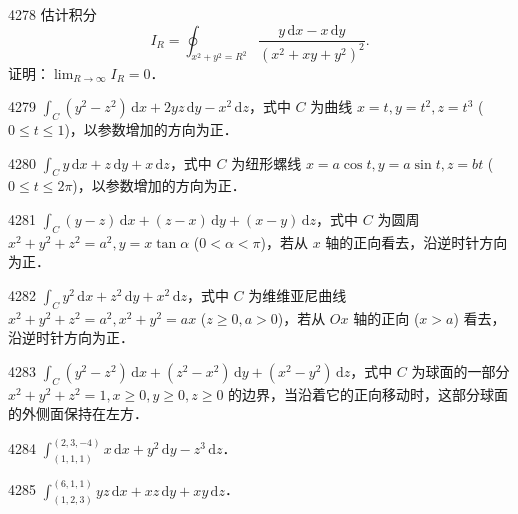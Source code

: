 \begin{prob}[M]{4278}
估计积分
\[
I_R = \oint_{x^2+y^2=R^2} \frac{y\,\mathrm{d}x - x\,\mathrm{d}y}{(x^2+xy+y^2)^2}.
\]
证明：$\lim_{R\to\infty} I_R = 0$．
\end{prob}


\begin{prob}[S]{4279}
$\displaystyle\int_C (y^2 - z^2)\,\mathrm{d}x + 2yz\,\mathrm{d}y - x^2\,\mathrm{d}z$，式中 $C$ 为曲线 $x = t, y = t^2, z = t^3$ ($0 \leqslant t \leqslant 1$)，以参数增加的方向为正．
\end{prob}

\begin{prob}[S]{4280}
$\displaystyle\int_C y\,\mathrm{d}x + z\,\mathrm{d}y + x\,\mathrm{d}z$，式中 $C$ 为纽形螺线 $x = a\cos t, y = a\sin t, z = bt$ ($0 \leqslant t \leqslant 2\pi$)，以参数增加的方向为正．
\end{prob}

\begin{prob}[M]{4281}
$\displaystyle\int_C (y-z)\,\mathrm{d}x + (z-x)\,\mathrm{d}y + (x-y)\,\mathrm{d}z$，式中 $C$ 为圆周 $x^2+y^2+z^2 = a^2, y = x\tan\alpha$ ($0 < \alpha < \pi$)，若从 $x$ 轴的正向看去，沿逆时针方向为正．
\end{prob}

\begin{prob}[M]{4282}
$\displaystyle\int_C y^2\,\mathrm{d}x + z^2\,\mathrm{d}y + x^2\,\mathrm{d}z$，式中 $C$ 为维维亚尼曲线 $x^2+y^2+z^2 = a^2, x^2+y^2 = ax$ ($z \geqslant 0, a > 0$)，若从 $Ox$ 轴的正向 ($x > a$) 看去，沿逆时针方向为正．
\end{prob}

\begin{prob}[M]{4283}
$\displaystyle\int_C (y^2-z^2)\,\mathrm{d}x + (z^2-x^2)\,\mathrm{d}y + (x^2-y^2)\,\mathrm{d}z$，式中 $C$ 为球面的一部分 $x^2+y^2+z^2 = 1, x \geqslant 0, y \geqslant 0, z \geqslant 0$ 的边界，当沿着它的正向移动时，这部分球面的外侧面保持在左方．
\end{prob}


\begin{prob}[S]{4284}
$\displaystyle\int_{(1,1,1)}^{(2,3,-4)} x\,\mathrm{d}x + y^2\,\mathrm{d}y - z^3\,\mathrm{d}z$．
\end{prob}

\begin{prob}[S]{4285}
$\displaystyle\int_{(1,2,3)}^{(6,1,1)} yz\,\mathrm{d}x + xz\,\mathrm{d}y + xy\,\mathrm{d}z$．
\end{prob}

